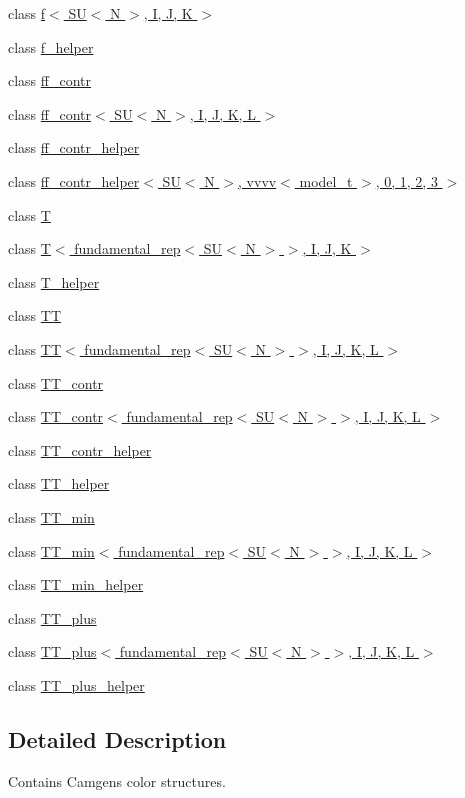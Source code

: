 \begin{DoxyCompactItemize}
class \hyperlink{a00218}{f$<$ S\+U$<$ N $>$, I, J, K $>$}
\item 
class \hyperlink{a00219}{f\+\_\+helper}
\item 
class \hyperlink{a00226}{ff\+\_\+contr}
\item 
class \hyperlink{a00227}{ff\+\_\+contr$<$ S\+U$<$ N $>$, I, J, K, L $>$}
\item 
class \hyperlink{a00228}{ff\+\_\+contr\+\_\+helper}
\item 
class \hyperlink{a00229}{ff\+\_\+contr\+\_\+helper$<$ S\+U$<$ N $>$, vvvv$<$ model\+\_\+t $>$, 0, 1, 2, 3 $>$}
\item 
class \hyperlink{a00536}{T}
\item 
class \hyperlink{a00537}{T$<$ fundamental\+\_\+rep$<$ S\+U$<$ N $>$ $>$, I, J, K $>$}
\item 
class \hyperlink{a00540}{T\+\_\+helper}
\item 
class \hyperlink{a00545}{T\+T}
\item 
class \hyperlink{a00546}{T\+T$<$ fundamental\+\_\+rep$<$ S\+U$<$ N $>$ $>$, I, J, K, L $>$}
\item 
class \hyperlink{a00547}{T\+T\+\_\+contr}
\item 
class \hyperlink{a00548}{T\+T\+\_\+contr$<$ fundamental\+\_\+rep$<$ S\+U$<$ N $>$ $>$, I, J, K, L $>$}
\item 
class \hyperlink{a00549}{T\+T\+\_\+contr\+\_\+helper}
\item 
class \hyperlink{a00550}{T\+T\+\_\+helper}
\item 
class \hyperlink{a00551}{T\+T\+\_\+min}
\item 
class \hyperlink{a00552}{T\+T\+\_\+min$<$ fundamental\+\_\+rep$<$ S\+U$<$ N $>$ $>$, I, J, K, L $>$}
\item 
class \hyperlink{a00553}{T\+T\+\_\+min\+\_\+helper}
\item 
class \hyperlink{a00554}{T\+T\+\_\+plus}
\item 
class \hyperlink{a00555}{T\+T\+\_\+plus$<$ fundamental\+\_\+rep$<$ S\+U$<$ N $>$ $>$, I, J, K, L $>$}
\item 
class \hyperlink{a00556}{T\+T\+\_\+plus\+\_\+helper}
\end{DoxyCompactItemize}


\subsection{Detailed Description}
Contains Camgen\textquotesingle{}s color structures. 